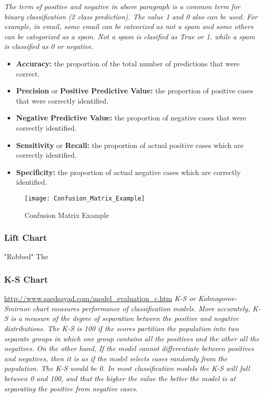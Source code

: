 \textit{The term of positive and negative in above paragraph is a common term for binary classification (2 class prediction). The value 1 and 0 also can be used. For example, in email, some email can be cateorized as not a spam and some others can be categorized as a spam. Not a spam is clasified as True or 1, while a spam is classified as 0 or negative.}

\begin{itemize}
	\item \textbf{Accuracy:} the proportion  of the total number of predictions that were correct.
	\item \textbf{Precision} or \textbf{Positive Predictive Value:} the proportion of positive cases that were correctly identified.
	\item \textbf{Negative Predictive Value:} the proportion of negative cases that were correctly identified.
	\item \textbf{Sensitivity} or \textbf{Recall:} the proportion of actual positive cases which are correctly identified.
	\item \textbf{Specificity:} the proportion of actual negative cases which are correctly identified.
\end{itemize}


\begin{figure}[H]
	\texttt{[image: Confusion\_Matrix\_Example]}
	\caption[Confusion Matrix Example]
	{Confusion Matrix Example}
	\label{fig:ConfusionMatrixExample}
\end{figure}


\subsubsection{Lift Chart}
"Robbed" The

\subsubsection{K-S Chart}
\url{http://www.saedsayad.com/model_evaluation_c.htm}
\textit{K-S or Kolmogorov-Smirnov chart measures performance of classification models. More accurately, K-S is a measure of the degree of separation between the positive and negative distributions. The K-S is 100 if the scores partition the population into two separate groups in which one group contains all the positives and the other all the negatives. On the other hand, If the model cannot differentiate between positives and negatives, then it is as if the model selects cases randomly from the population. The K-S would be 0. In most classification models the K-S will fall between 0 and 100, and that the higher the value the better the model is at separating the positive from negative cases.}

